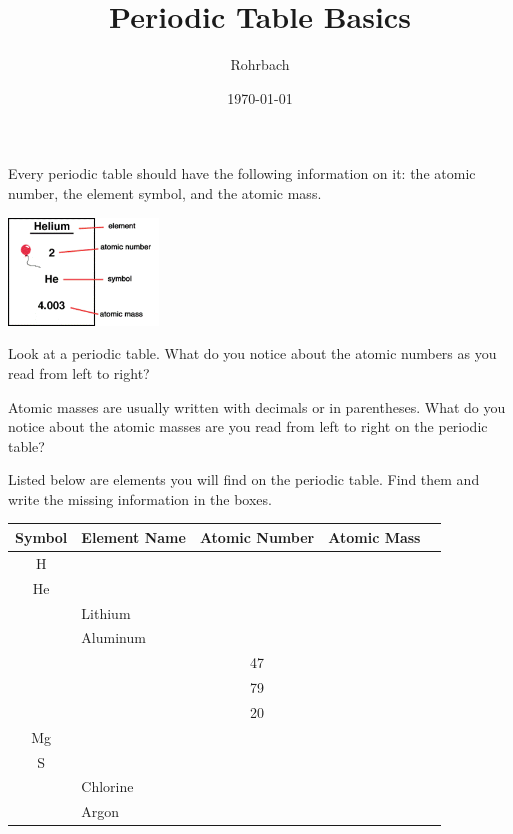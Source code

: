 \documentclass[10pt]{exam}
\title{Periodic Table Basics}
\author{Rohrbach}
\date{\today}
\begin{document}
\maketitle

\noindent
Every periodic table should have the following information on it: the atomic number, the element symbol, and the atomic mass.

\begin{center}
  \includegraphics[width=4cm]{ptable.png}
\end{center}


\begin{questions}

\question
  Look at a periodic table. What do you notice about the atomic numbers as you read from left to right? 
  \vs

\question
  Atomic masses are usually written with decimals or in parentheses.  What do you notice about the atomic masses are you read from left to right on the periodic table?
  \vs

\question
  Listed below are elements you will find on the periodic table.  Find them and write the missing information in the boxes.

\begin{center}
    \renewcommand{\arraystretch}{2}
  
    \begin{tabular}{|c|p{15em}|c|c|c|}
      \hline
      \bf Symbol         &
      \bf Element Name   &
      \bf Atomic Number  &
      \bf Atomic Mass       \\\hline
      H	 &          &    &  \\\hline		
      He &          &    &  \\\hline		
         & Lithium  &    &  \\\hline				
         & Aluminum &    &  \\\hline		
         &          & 47 &  \\\hline		
         &          & 79 &  \\\hline		
         &          & 20 &  \\\hline	
      Mg &          &    &  \\\hline		
      S  &          &    &  \\\hline		
         & Chlorine &    &  \\\hline				
         & Argon    &    &  \\\hline	
      
    \end{tabular}
\end{center}

\end{questions}
\end{document}

